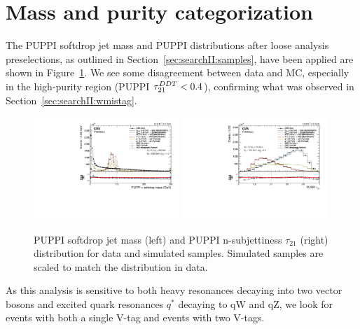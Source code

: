 \section{Mass and purity categorization}
The PUPPI softdrop jet mass and PUPPI \nsubj distributions after loose analysis preselections, as outlined in Section~\ref{sec:searchII:samples},  have been applied are shown in Figure~\ref{fig:searchII:wtag}.
We see some disagreement between data and MC, especially in the high-purity region (PUPPI $\tau_{21}^{DDT}<0.4$), confirming what was observed in Section~\ref{sec:searchII:wmistag}.
\begin{figure}[h!]
\centering
\includegraphics[width=0.49\textwidth]{figures/analysis/search2/AN-16-235/plots/qcdcp_PuppiSoftdropMass.pdf}
\includegraphics[width=0.49\textwidth]{figures/analysis/search2/AN-16-235/plots/qcdcp_puppi_tau2tau1.pdf}
\caption{PUPPI softdrop jet mass (left) and PUPPI n-subjettiness $\tau_{21}$ (right) distribution for data and simulated samples. Simulated samples are scaled to match the distribution in data.}
\label{fig:searchII:wtag}
\end{figure}
\noindent As this analysis is sensitive to both heavy resonances decaying into two vector bosons and excited quark resonances $q^*$ decaying to qW and qZ, we look for events with both a single V-tag and events with two V-tags. 

